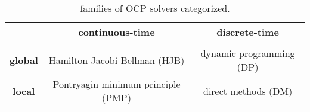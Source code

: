 \begin{table}[b]
	\centering 
	\caption{families of OCP solvers categorized.} \label{tab:ocpsolvers}
	\begin{tabular}{c c c}
		& \textbf{continuous-time} & \textbf{discrete-time} \\ \hline \hline \\ [-1.8ex]
		\textbf{global} & Hamilton-Jacobi-Bellman (HJB) & dynamic programming (DP) \\
		\textbf{local} & Pontryagin minimum principle (PMP) & direct methods (DM)
	\end{tabular}
\end{table}
